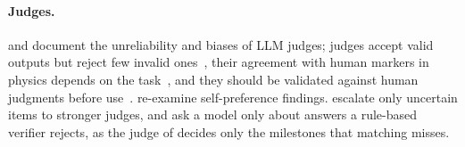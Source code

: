 \paragraph{Judges.} \citet{thakur2025judgingjudges} and \citet{ye2025justiceprejudice} document the
unreliability and biases of LLM judges; judges accept valid outputs but reject few invalid
ones~\citep{jain2025agreeableness}, their agreement with human markers in physics depends on the
task~\citep{yeadon2026physicsjudge}, and they should be validated against human judgments before
use~\citep{bavaresco2025llmsinsteadofhumans}.
\citet{roytburg2026narcissists} re-examine self-preference findings.
\citet{jung2025trustescalate} escalate only uncertain items to stronger judges, and
\citet{huang2026verifierrobustness} ask a model only about answers a rule-based verifier rejects, as
the judge of \ourdataset decides only the milestones that matching misses.
